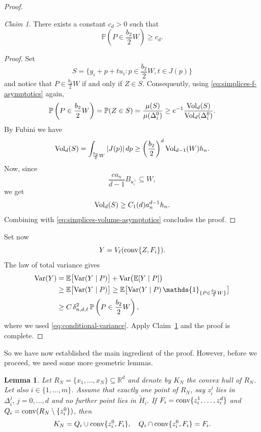 \documentclass[10pt]{amsart}
\newcommand{\1}{\textbf{1}}
\newcommand{\conv}{{\rm conv}}
\newcommand{\vol}{{\rm Vol}}
\newcommand{\Var}{{\rm Var}}
\numberwithin{equation}{section} %
\newtheorem{lemma}[theorem]{Lemma}
\theoremstyle{remark}
\newtheorem{claim}{Claim}
\theoremstyle{definition}
\begin{document}
\begin{proof}
\begin{claim}\label{claim:W-positive-probability}
There exists a constant $c_d>0$ such that \[\mathbb{P} \left(P\in \frac{b_2}{2}W\right) \geq c_d. \]    
\end{claim}

\begin{proof}
     Set \[S=\biggl\{y_i+p+tu_i: p \in \frac{b_2}{2}W, t \in J(p)\biggr\}\] and notice that $P\in \frac{b_2}{2}W$ if and only if $Z \in S$. Consequently, using \eqref{eq:simplices-f-asymptotics}  again,\[\mathbb{P} \left(P\in \frac{b_2}{2}W\right)=\mathbb{P}(Z \in S)=\frac{\mu(S)}{\mu(\Delta_i^0)} \geq e^{-1}\frac{\vol_d(S)}{\vol_d(\Delta_i^0)}.\] By Fubini we have \[
     \vol_d(S)=\int_{\frac{b_2}{2}W} |J(p)| \, dp \geq \left(\frac{b_2}{2} \right)^d\vol_{d-1}(W)h_n.  
     \] Now, since \[\frac{ca_n}{d-1}B_{u_i^\perp} \subseteq W,\] we get \[\vol_{d}(S) \geq C_1(d) a_n^{d-1}h_n.\] Combining with \eqref{eq:simplices-volume-asymptotics} concludes the proof.
\end{proof}

 Set now \[Y= V_\ell(\conv\{Z,F_i\}).\] The law of total variance gives \begin{align*}
 \Var(Y) &=\mathbb{E}\bigl[\Var(Y \mid P)\bigr]+\Var\bigl(\mathbb{E}[Y\mid P]\bigr) \\
 &\geq \mathbb{E}\bigl[\Var(Y\mid P)\bigr] \geq \mathbb{E}\bigl[\Var(Y\mid P) \, \mathds{1}_{\{P \in \frac{b_2}{2}W\}}\bigr] \\
 &\geq C\, \delta_{n,d,\ell}^2\, \mathbb{P}\left(P \in \frac{b_2}{2}W \right),
 \end{align*} where we used \eqref{eq:conditional-variance}. Apply Claim~\ref{claim:W-positive-probability} and the proof is complete.
\end{proof}


So we have now established the main ingredient of the proof. However, before we proceed, we need some more geometric lemmas.

\begin{lemma}\label{lem:summability-possible}
    Let $R_N=\{x_1,\ldots,x_N\} \subseteq \mathbb{R}^d$ and denote by $K_N$ the convex hull of $R_N$. Let also $i \in \{1,\ldots,m\}$. Assume that exactly one point of $R_N$, say $z_i^j$ lies in $\Delta_i^j, \, j=0,\ldots,d$ and no further point lies in $\widetilde{H}_i$. If $F_i=\conv\{z_i^1,\ldots,z_i^d\}$ and $Q_i=\conv(R_N\setminus\{z_i^0\})$, then \[K_N=Q_i \cup \conv\{z_i^0,F_i\}, \quad Q_i \cap \conv\{z_i^0,F_i\}=F_i. \]
\end{lemma}
\end{document}

